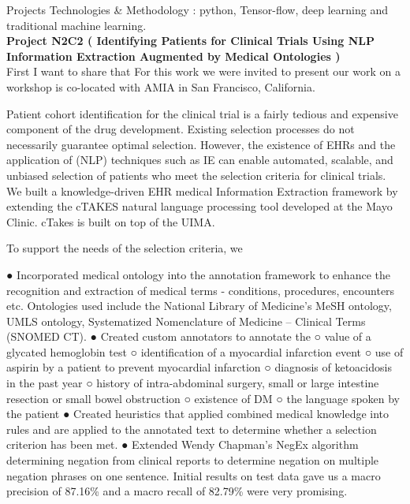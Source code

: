\documentclass{resume} %
\begin{document}
\begin{rSection}{Projects}
Technologies \& Methodology : 
python, Tensor-flow, deep learning and traditional machine learning.\\


{\bf Project N2C2 ( Identifying Patients for Clinical Trials Using NLP Information Extraction Augmented by Medical Ontologies )
}\\
First I want to share that For this work we were invited to present our work on a workshop is co-located with AMIA in San Francisco, California. 

Patient cohort identification for the clinical trial is a fairly tedious and expensive component of the drug
development. Existing selection processes do not necessarily guarantee optimal selection. However, the
existence of EHRs and the application of
(NLP) techniques such as IE can enable automated, scalable, and
unbiased selection of patients who meet the selection criteria for clinical trials.
We built a knowledge-driven EHR medical Information Extraction framework by extending the
cTAKES natural language processing tool developed at the Mayo Clinic. cTakes is built on top of
the UIMA.

To support the needs of the selection criteria, we

● Incorporated medical ontology into the annotation framework to enhance the
recognition and extraction of medical terms - conditions, procedures, encounters etc.
Ontologies used include the National Library of Medicine's MeSH
ontology, UMLS ontology, Systematized
Nomenclature of Medicine -- Clinical Terms (SNOMED CT).
● Created custom annotators to annotate the
○ value of a glycated hemoglobin test
○ identification of a myocardial infarction event
○ use of aspirin by a patient to prevent myocardial infarction
○ diagnosis of ketoacidosis in the past year
○ history of intra-abdominal surgery, small or large intestine resection or small
bowel obstruction
○ existence of DM
○ the language spoken by the patient
● Created heuristics that applied combined medical knowledge into rules and are applied
to the annotated text to determine whether a selection criterion has been met.
● Extended Wendy Chapman's NegEx algorithm determining negation from clinical reports
to determine negation on multiple negation phrases on one sentence.
Initial results on test data gave us a macro precision of 87.16\% and a macro recall of 82.79\%
were very promising. 

\end{rSection}
\end{document}
